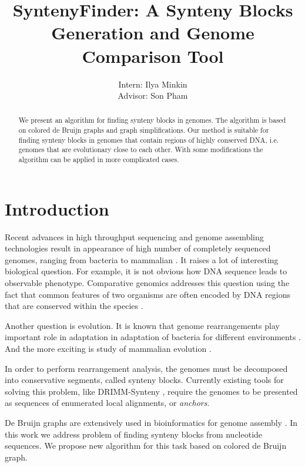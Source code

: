 \documentclass[a4paper,12pt]{scrartcl}
\begin{document}
\title{SyntenyFinder: A Synteny Blocks Generation and Genome Comparison Tool}
\author{Intern: Ilya Minkin\\
	Advisor: Son Pham}
\date{}
\maketitle

\begin{abstract}
We present an algorithm for finding synteny blocks in genomes. The algorithm is based on colored de Bruijn graphs and graph simplifications.
Our method is suitable for finding synteny blocks in genomes that contain regions of highly conserved DNA, i.e. genomes that are evolutionary
close to each other. With some modifications the algorithm can be applied in more complicated cases.
\end{abstract}

\section{Introduction}

Recent advances in high throughput sequencing and genome assembling technologies result in appearance of high number of
completely sequenced genomes, ranging from bacteria to mammalian \cite{Genome10K}. It raises a lot of interesting 
biological question. For example, it is not obvious how DNA sequence leads to observable phenotype. Comparative genomics
addresses this question using the fact that common features of two organisms are often encoded by DNA regions that are conserved
within the species \cite{ComparativeGenomics}. 

Another question is evolution. It is known that genome rearrangements play important role in adaptation in adaptation of bacteria
for different environments \cite{GenomeEvolutionAdaptation}. And the more exciting is study of mammalian evolution \cite{HumanMouse}.

In order to perform rearrangement analysis, the genomes must be decomposed into conservative segments,
called synteny blocks. Currently existing tools for solving this problem, like DRIMM-Synteny
\cite{Pham2010}, require the genomes to be presented as sequences of enumerated local alignments, or \textit{anchors}.

De Bruijn graphs are extensively used in bioinformatics for genome assembly \cite{Pevzner2001, Iqbal2012}. 
In this work we address problem of finding synteny blocks from nucleotide sequences. We propose new 
algorithm for this task based on colored de Bruijn graph.
\end{document}
